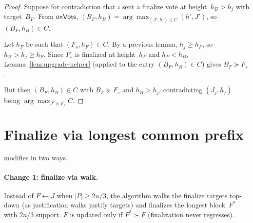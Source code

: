 \documentclass{article}
\theoremstyle{plain}
\newtheorem{lemma}{Lemma}
\theoremstyle{definition}
\theoremstyle{remark}
\begin{document}
\begin{proof}
Suppose for contradiction that $i$ sent a finalize vote at height~$h_B > h_j$ with target~$B_F$.
From $\textsf{onVote}$, $(B_F, h_B) = \arg\max_{(J',h')\in C}(h', J')$, so $(B_F, h_B) \in C$.

Let $h_F$ be such that $(F_s, h_F) \in C$.
By a previous lemma, $h_j \geq h_F$, so $h_B > h_j \geq h_F$.
Since $F_s$ is finalized at height~$h_F$ and $h_F < h_B$, Lemma~\ref{lem:upgrade-helper} (applied to the entry $(B_F, h_B) \in C$) gives $B_F \succeq F_s$.

But then $(B_F, h_B) \in C$ with $B_F \succeq F_s$ and $h_B > h_j$, contradicting $(J_j, h_j)$ being $\arg\max_{J' \succeq F_s} C$.
\end{proof}





  

\section{Finalize via longest common prefix}

 modifies  in two ways.

\paragraph{Change 1: finalize via walk.}
Instead of $F \gets J$ when $|P| \geq 2n/3$, the algorithm walks the finalize targets top-down (as justification walks justify targets) and finalizes the longest block~$F^*$ with $2n/3$ support.
$F$ is updated only if $F^* \succ F$ (finalization never regresses).
\end{document}
